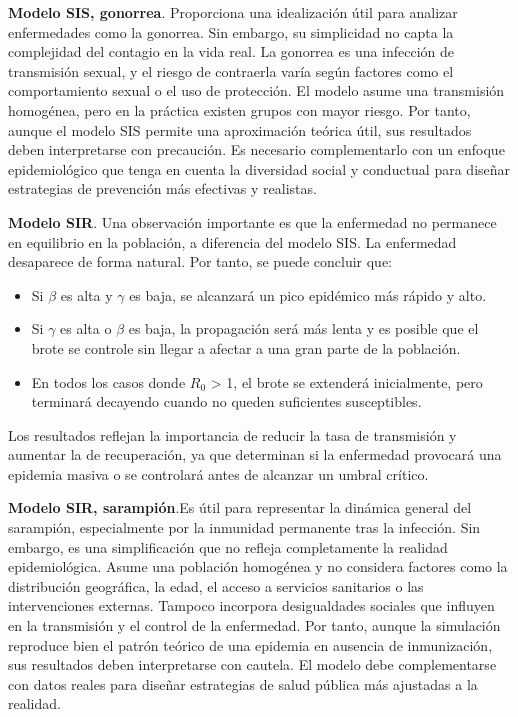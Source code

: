 \vspace{2em}

\textbf{Modelo SIS, gonorrea}. Proporciona una idealización útil para analizar enfermedades como la gonorrea. Sin embargo, su simplicidad no capta la complejidad del contagio en la vida real.
La gonorrea es una infección de transmisión sexual, y el riesgo de contraerla varía según factores como el comportamiento sexual o el uso de protección. El modelo asume una transmisión homogénea, pero en la práctica existen grupos con mayor riesgo.
Por tanto, aunque el modelo SIS permite una aproximación teórica útil, sus resultados deben interpretarse con precaución. Es necesario complementarlo con un enfoque epidemiológico que tenga en cuenta la diversidad social y conductual para diseñar estrategias de prevención más efectivas y realistas.

\vspace{2em}

\textbf{Modelo SIR}. 	
Una observación importante es que la enfermedad no permanece en equilibrio en la población, a diferencia del modelo SIS. La enfermedad desaparece de forma natural.
Por tanto, se puede concluir que:
\begin{itemize}
    \item Si $\beta$ es alta y $\gamma$ es baja, se alcanzará un pico epidémico más rápido y alto.
    \item Si $\gamma$ es alta o $\beta$ es baja, la propagación será más lenta y es posible que el brote se controle sin llegar a afectar a una gran parte de la población.
    \item En todos los casos donde $R_0$ > 1, el brote se extenderá inicialmente, pero terminará decayendo cuando no queden suficientes susceptibles.
\end{itemize}
Los resultados reflejan la importancia de reducir la tasa de transmisión y aumentar la de recuperación, ya que determinan si la enfermedad provocará una epidemia masiva o se controlará antes de alcanzar un umbral crítico.

\vspace{2em}

\textbf{Modelo SIR, sarampión}.Es útil para representar la dinámica general del sarampión, especialmente por la inmunidad permanente tras la infección. Sin embargo, es una simplificación que no refleja completamente la realidad epidemiológica.
Asume una población homogénea y no considera factores como la distribución geográfica, la edad, el acceso a servicios sanitarios o las intervenciones externas. Tampoco incorpora desigualdades sociales que influyen en la transmisión y el control de la enfermedad.
Por tanto, aunque la simulación reproduce bien el patrón teórico de una epidemia en ausencia de inmunización, sus resultados deben interpretarse con cautela. El modelo debe complementarse con datos reales para diseñar estrategias de salud pública más ajustadas a la realidad.

